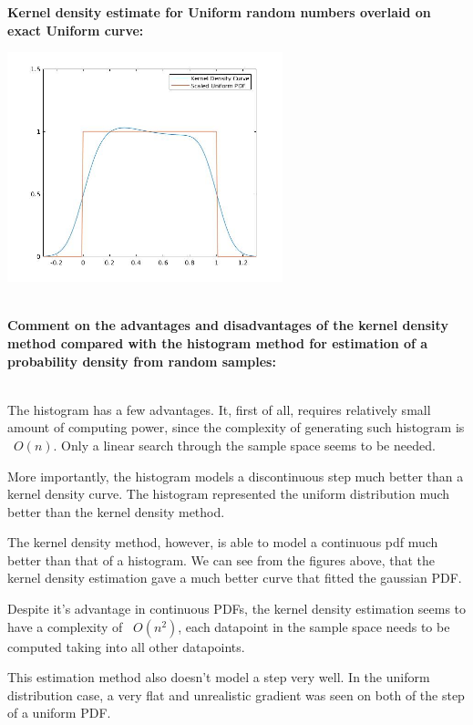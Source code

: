 \documentclass[12pt]{article}
\begin{document}
{\bf Kernel density estimate for Uniform random numbers overlaid on exact Uniform curve:}
\begin{center}
\includegraphics[width=0.6\textwidth]{uniform-ks-1000.jpg}
\end{center}
\\
\pagebreak
{\bf Comment on the advantages and disadvantages of the kernel density method compared with the histogram method for estimation of a probability density from random samples:}
\\\\
{\small\textsf
The histogram has a few advantages. It, first of all, requires relatively small amount of computing power, since the complexity of generating such histogram is ~$O(n)$. Only a linear search through the sample space seems to be needed.
\par\bigskip
More importantly, the histogram models a discontinuous step much better than a kernel density curve. The histogram represented the uniform distribution much better than the kernel density method.
\par\bigskip
The kernel density method, however, is able to model a continuous pdf much better than that of a histogram. We can see from the figures above, that the kernel density estimation gave a much better curve that fitted the gaussian PDF.
\par\bigskip
Despite it's advantage in continuous PDFs, the kernel density estimation seems to have a complexity of ~$O(n^2)$, each datapoint in the sample space needs to be computed taking into all other datapoints.
\par\bigskip
This estimation method also doesn't model a step very well. In the uniform distribution case, a very flat and unrealistic gradient was seen on both of the step of a uniform PDF.
\par\bigskip
}
\end{document}

